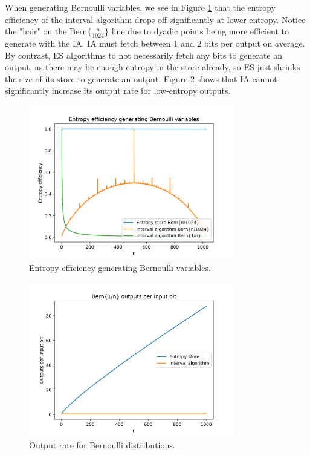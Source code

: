 \documentclass[12pt]{article}
\newcommand{\bern}[1]{\mathrm{Bern}\{#1\}}
\begin{document}
When generating Bernoulli variables, we see in Figure \ref{fig:bernoulli-efficiency} that the entropy efficiency of the interval algorithm drops off significantly at lower entropy. Notice the "hair" on the $\bern{\frac{n}{1024}}$ line due to dyadic points being more efficient to generate with the IA. IA must fetch between 1 and 2 bits per output on average. By contrast, ES algorithms to not necessarily fetch any bits to generate an output, as there may be enough entropy in the store already, so ES just shrinks the size of its store to generate an output. Figure \ref{fig:bernoulli-rate} shows that IA cannot significantly increase its output rate for low-entropy outputs.

\begin{figure}[ht]
\centering
\includegraphics[width=0.8\textwidth]{bernoulli_efficiency.png}
\caption{Entropy efficiency generating Bernoulli variables.}
\label{fig:bernoulli-efficiency}
\end{figure}

\begin{figure}[ht]
\centering
\includegraphics[width=0.8\textwidth]{bernoulli_rate.png}
\caption{Output rate for Bernoulli distributions.}
\label{fig:bernoulli-rate}
\end{figure}
\end{document}
